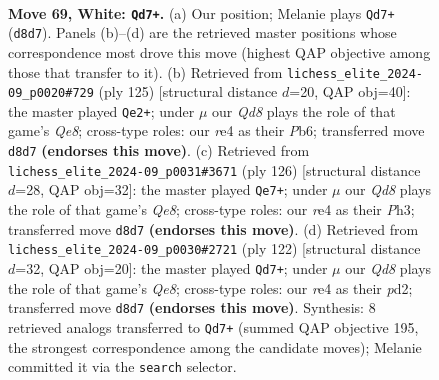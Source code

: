 \documentclass[11pt]{article}
\begin{document}
\clearpage

\begin{figure}[p]\centering
\begin{subfigure}{0.46\textwidth}\centering
\resizebox{\linewidth}{!}{%
\newchessgame
\chessboard[
  setfen={3Q4/6k1/5p1q/3p4/4r3/6P1/6KP/8 w - - 18 69},
  showmover=false,
  pgfstyle=straightmove, color=movearrow, markmove={d8-d7}
]}
\caption{}
\end{subfigure}\hfill
\begin{subfigure}{0.46\textwidth}\centering
\resizebox{\linewidth}{!}{%
\newchessgame
\chessboard[
  setfen={8/3QP3/1p4p1/2k2p2/8/6P1/7K/4q3 b - - 6 63},
  showmover=false,
  pgfstyle=straightmove, color=movearrow, markmove={e1-e2}
]}
\caption{}
\end{subfigure}
\\[4pt]
\begin{subfigure}{0.46\textwidth}\centering
\resizebox{\linewidth}{!}{%
\newchessgame
\chessboard[
  setfen={4Q3/6k1/6p1/8/3p4/3q2PP/6K1/8 w - - 11 64},
  showmover=false,
  pgfstyle=straightmove, color=movearrow, markmove={e8-e7}
]}
\caption{}
\end{subfigure}\hfill
\begin{subfigure}{0.46\textwidth}\centering
\resizebox{\linewidth}{!}{%
\newchessgame
\chessboard[
  setfen={4Q3/7k/6pp/q7/7P/6P1/3p1PK1/8 w - - 11 62},
  showmover=false,
  pgfstyle=straightmove, color=movearrow, markmove={e8-d7}
]}
\caption{}
\end{subfigure}
\caption{\textbf{Move 69, White: \texttt{Qd7+}.} (a) Our position; Melanie plays \texttt{Qd7+} (\texttt{d8d7}). Panels (b)--(d) are the retrieved master positions whose correspondence most drove this move (highest QAP objective among those that transfer to it). (b) Retrieved from \texttt{lichess\_elite\_2024-09\_p0020\#729} (ply 125) [structural distance $d$=20, QAP obj=40]: the master played \texttt{Qe2+}; under $\mu$ our \emph{Qd8} plays the role of that game's \emph{Qe8}; cross-type roles: our \emph{r}e4 as their \emph{P}b6; transferred move \texttt{d8d7} \textbf{(endorses this move)}. (c) Retrieved from \texttt{lichess\_elite\_2024-09\_p0031\#3671} (ply 126) [structural distance $d$=28, QAP obj=32]: the master played \texttt{Qe7+}; under $\mu$ our \emph{Qd8} plays the role of that game's \emph{Qe8}; cross-type roles: our \emph{r}e4 as their \emph{P}h3; transferred move \texttt{d8d7} \textbf{(endorses this move)}. (d) Retrieved from \texttt{lichess\_elite\_2024-09\_p0030\#2721} (ply 122) [structural distance $d$=32, QAP obj=20]: the master played \texttt{Qd7+}; under $\mu$ our \emph{Qd8} plays the role of that game's \emph{Qe8}; cross-type roles: our \emph{r}e4 as their \emph{p}d2; transferred move \texttt{d8d7} \textbf{(endorses this move)}. Synthesis: 8 retrieved analogs transferred to \texttt{Qd7+} (summed QAP objective 195, the strongest correspondence among the candidate moves); Melanie committed it via the \texttt{search} selector.}
\label{fig:thought-m136}
\end{figure}
\end{document}
